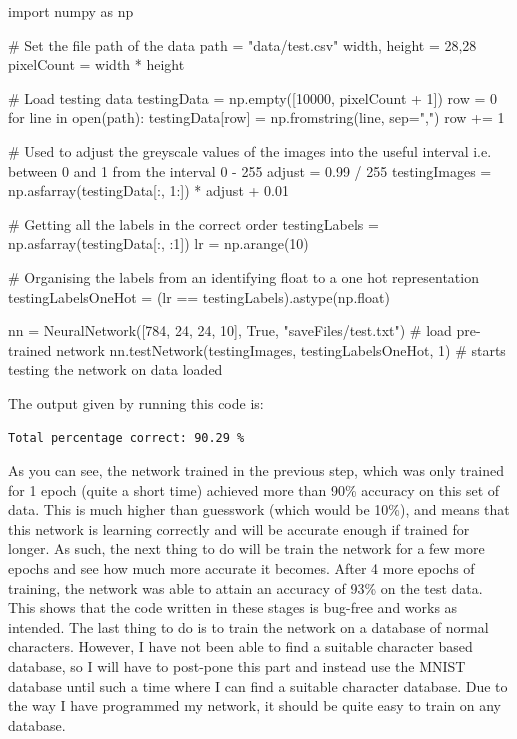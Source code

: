 \documentclass{report}
\begin{document}
\begin{python}
import numpy as np

# Set the file path of the data
path = "data/test.csv"
width, height = 28,28
pixelCount = width * height

# Load testing data
testingData = np.empty([10000, pixelCount + 1])
row = 0
for line in open(path):
    testingData[row] = np.fromstring(line, sep=",")
    row += 1

# Used to adjust the greyscale values of the images into the useful interval i.e. between 0 and 1 from the interval 0 - 255
adjust = 0.99 / 255
testingImages = np.asfarray(testingData[:, 1:]) * adjust + 0.01

# Getting all the labels in the correct order
testingLabels = np.asfarray(testingData[:, :1])
lr = np.arange(10)

# Organising the labels from an identifying float to a one hot representation
testingLabelsOneHot = (lr == testingLabels).astype(np.float)

nn = NeuralNetwork([784, 24, 24, 10], True, "saveFiles/test.txt")  # load pre-trained network
nn.testNetwork(testingImages, testingLabelsOneHot, 1)  # starts testing the network on data loaded
\end{python}
The output given by running this code is:
\begin{verbatim}
Total percentage correct: 90.29 %
\end{verbatim}
As you can see, the network trained in the previous step, which was only trained for 1 epoch (quite a short time) achieved more than 90\% accuracy on this set of data. This is much higher than guesswork (which would be 10\%), and means that this network is learning correctly and will be accurate enough if trained for longer. As such, the next thing to do will be train the network for a few more epochs and see how much more accurate it becomes.
\newline
After 4 more epochs of training, the network was able to attain an accuracy of 93\% on the test data. This shows that the code written in these stages is bug-free and works as intended.
\newline
The last thing to do is to train the network on a database of normal characters. However, I have not been able to find a suitable character based database, so I will have to post-pone this part and instead use the MNIST database until such a time where I can find a suitable character database. Due to the way I have programmed my network, it should be quite easy to train on any database.
\newpage
\end{document}
